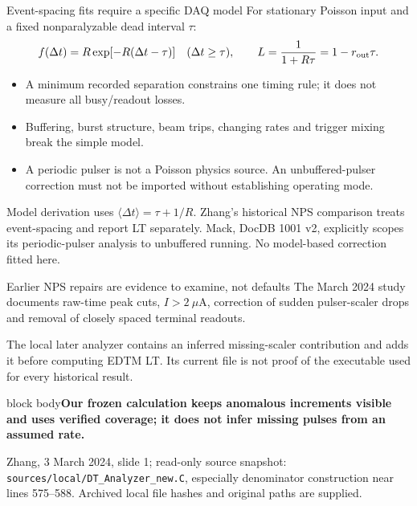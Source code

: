 \documentclass[aspectratio=169,11pt]{beamer}
\newcommand{\source}[1]{\par\vfill{\scriptsize\color{muted}#1\par}}
\newcommand{\takeaway}[1]{\begin{beamercolorbox}[sep=2.5mm,wd=\linewidth]{block body}\textbf{#1}\end{beamercolorbox}}
\begin{document}
\begin{frame}{Event-spacing fits require a specific DAQ model}
\small
For stationary Poisson input and a fixed nonparalyzable dead interval $\tau$:
\[f(\Delta t)=R\exp[-R(\Delta t-\tau)]\quad(\Delta t\ge\tau),\qquad L=\frac{1}{1+R\tau}=1-r_{\rm out}\tau.\]
\begin{itemize}\setlength\itemsep{2mm}
\item A minimum recorded separation constrains one timing rule; it does not measure all busy/readout losses.
\item Buffering, burst structure, beam trips, changing rates and trigger mixing break the simple model.
\item A periodic pulser is not a Poisson physics source. An unbuffered-pulser correction must not be imported without establishing operating mode.
\end{itemize}
\source{Model derivation uses $\langle\Delta t\rangle=\tau+1/R$. Zhang's historical NPS comparison treats event-spacing and report LT separately. Mack, DocDB 1001 v2, explicitly scopes its periodic-pulser analysis to unbuffered running. No model-based correction fitted here.}
\end{frame}

\begin{frame}{Earlier NPS repairs are evidence to examine, not defaults}
\small
The March 2024 study documents raw-time peak cuts, $I>2~\mu$A, correction of sudden pulser-scaler drops and removal of closely spaced terminal readouts.
\vspace{3mm}\par The local later analyzer contains an inferred missing-scaler contribution and adds it before computing EDTM LT. Its current file is not proof of the executable used for every historical result.
\vspace{4mm}\takeaway{Our frozen calculation keeps anomalous increments visible and uses verified coverage; it does not infer missing pulses from an assumed rate.}
\source{Zhang, 3 March 2024, slide 1; read-only source snapshot: \texttt{sources/local/DT\_Analyzer\_new.C}, especially denominator construction near lines 575--588. Archived local file hashes and original paths are supplied.}
\end{frame}
\end{document}
